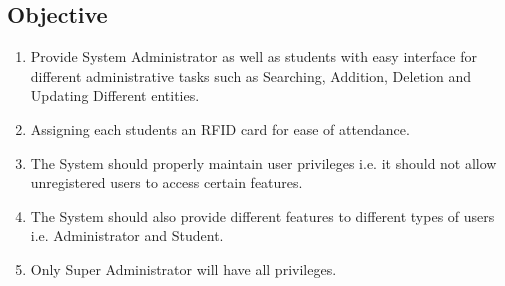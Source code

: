 \subsection{Objective}
\begin{enumerate}
    \item Provide System Administrator as well as students with easy interface for different administrative tasks such as Searching, Addition, Deletion and Updating Different entities.
    \item Assigning each students an RFID card for ease of attendance. 
    \item The System should properly maintain user privileges i.e. it should not allow unregistered users to access certain features.
    \item The System should also provide different features to different types of users i.e. Administrator and Student.
    \item Only Super Administrator will have all privileges.
\end{enumerate}